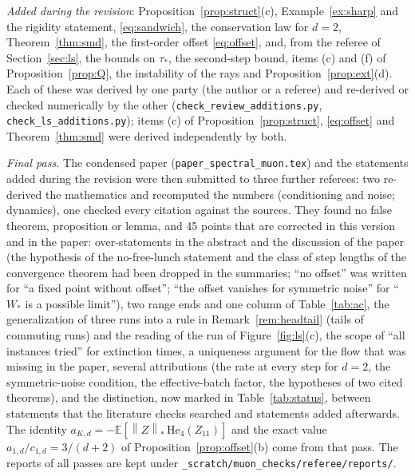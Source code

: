 \documentclass[11pt]{article}
\theoremstyle{definition}
\theoremstyle{remark}
\newcommand{\E}{\mathbb{E}}
\newcommand{\nnuc}[1]{\left\|#1\right\|_{*}}
\begin{document}
\emph{Added during the revision}: Proposition~\ref{prop:struct}(c), Example~\ref{ex:sharp}
and the rigidity statement, \eqref{eq:sandwich}, the conservation law for $d=2$, Theorem~\ref{thm:smd}, the
first-order offset \eqref{eq:offset}, and, from the referee of Section~\ref{sec:ls}, the bounds on $\tau_\ast$, the
second-step bound, items (c) and (f) of Proposition~\ref{prop:Q}, the instability of the rays and
Proposition~\ref{prop:ext}(d). Each of these was derived by one party (the author or a referee) and re-derived or
checked numerically by the other (\texttt{check\_review\_additions.py}, \texttt{check\_ls\_additions.py}); items (c)
of Proposition~\ref{prop:struct}, \eqref{eq:offset} and Theorem~\ref{thm:smd} were derived independently by both.

\emph{Final pass.} The condensed paper (\texttt{paper\_spectral\_muon.tex}) and the statements added during the
revision were then submitted to three further referees: two re-derived the mathematics and recomputed the numbers
(conditioning and noise; dynamics), one checked every citation against the sources. They found no false theorem,
proposition or lemma, and 45 points that are corrected in this version and in the paper: over-statements in the
abstract and the discussion of the paper (the hypothesis of the no-free-lunch statement and the class of step lengths
of the convergence theorem had been dropped in the summaries; ``no offset'' was written for ``a fixed point without
offset''; ``the offset vanishes for symmetric noise'' for ``$W_\ast$ is a possible limit''), two range ends and one
column of Table~\ref{tab:ac}, the generalization of three runs into a rule in Remark~\ref{rem:headtail} (tails of
commuting runs) and the reading of the run of Figure~\ref{fig:ls}(c), the scope of ``all instances tried'' for
extinction times, a uniqueness argument for the flow that was missing in the paper, several attributions (the rate at
every step for $d=2$, the symmetric-noise condition, the effective-batch factor, the hypotheses of two cited theorems),
and the distinction, now marked in Table~\ref{tab:status}, between statements that the literature checks searched and
statements added afterwards. The identity $a_{K,d}=-\E[\nnuc Z\,\mathrm{He}_4(Z_{11})]$ and the exact value
$a_{1,d}/c_{1,d}=3/(d+2)$ of Proposition~\ref{prop:offset}(b) come from that pass. The reports of all passes are kept
under \texttt{\_scratch/muon\_checks/referee/reports/}.
\end{document}
